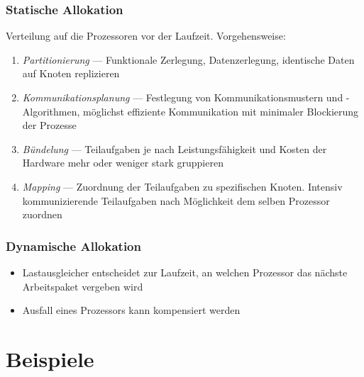 \documentclass[a4paper, 12pt]{article}
\begin{document}
\subsubsection*{Statische Allokation}
Verteilung auf die Prozessoren vor der Laufzeit. Vorgehensweise:
\begin{enumerate}
  \item \emph{Partitionierung} --- Funktionale Zerlegung, Datenzerlegung, identische Daten auf Knoten replizieren
  \item \emph{Kommunikationsplanung} --- Festlegung von Kommunikationsmustern und -Algorithmen, möglichst effiziente Kommunikation mit minimaler Blockierung der Prozesse
  \item \emph{Bündelung} --- Teilaufgaben je nach Leistungsfähigkeit und Kosten der Hardware mehr oder weniger stark gruppieren
  \item \emph{Mapping} --- Zuordnung der Teilaufgaben zu spezifischen Knoten. Intensiv kommunizierende Teilaufgaben nach Möglichkeit dem selben Prozessor zuordnen
\end{enumerate}

\subsubsection*{Dynamische Allokation}
\begin{itemize}
  \item Lastausgleicher entscheidet zur Laufzeit, an welchen Prozessor das nächste Arbeitspaket vergeben wird
  \item Ausfall eines Prozessors kann kompensiert werden
\end{itemize}



\section{Beispiele}
\end{document}
